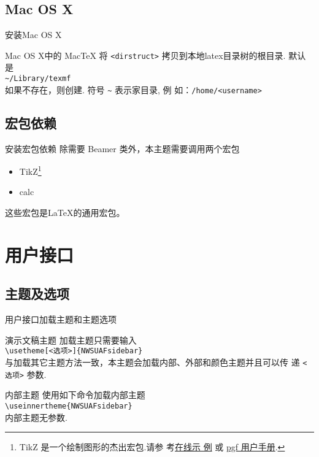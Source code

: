 \subsection{Mac OS X}
\begin{frame}{安装}{Mac OS X}
  \begin{block}{Mac OS X中的 MacTeX}
    将 {\tt <dirstruct>} 拷贝到本地latex目录树的根目录. 默认是\\
    {\tt \textasciitilde /Library/texmf}\\
    如果不存在，则创建. 符号 {\tt \textasciitilde} 表示家目录, 例
    如：{\tt /home/<username>}
  \end{block}
\end{frame}

\subsection{宏包依赖}
\begin{frame}{安装}{宏包依赖}
  除需要 Beamer 类外，本主题需要调用两个宏包
  \begin{itemize}
  \item TikZ\footnote{TikZ 是一个绘制图形的杰出宏包.请参
      考\href{http://www.texample.net/tikz/examples/}{在线示
        例} 或
      \href{http://tug.ctan.org/tex-archive/graphics/pgf/base/doc/generic/pgf/pgfmanual.pdf}{pgf
        用户手册}. }
  \item calc
  \end{itemize}
  这些宏包是{\LaTeX}的通用宏包。
\end{frame}

\section{用户接口}
\subsection{主题及选项}
\begin{frame}{用户接口}{加载主题和主题选项}
  \begin{block}{演示文稿主题}
    加载主题只需要输入\\
    {\tt \textbackslash usetheme[<选项>]\{NWSUAFsidebar\}}\\
    与加载其它主题方法一致，本主题会加载内部、外部和颜色主题并且可以传
    递 {\tt <选项>} 参数.
  \end{block}
  \begin{block}{内部主题}
    使用如下命令加载内部主题\\
    {\tt \textbackslash useinnertheme\{NWSUAFsidebar\}}\\
    内部主题无参数.
  \end{block}
\end{frame}

